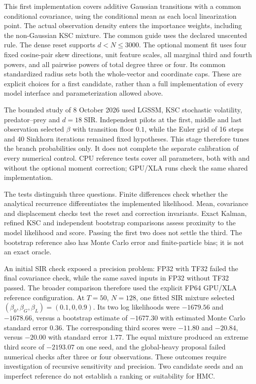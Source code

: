 This first implementation covers additive Gaussian transitions with a common
conditional covariance, using the conditional mean as each local linearization
point. The actual observation density enters the importance weights, including
the non-Gaussian KSC mixture. The common guide uses the declared unscented rule.
The dense reset supports \(d<N\leq3000\). The optional moment fit uses four
fixed cosine-pair skew directions, unit feature scales, all marginal third and
fourth powers, and all pairwise powers of total degree three or four. Its common
standardized radius sets both the whole-vector and coordinate caps.
These are explicit choices for a first candidate, rather than a full
implementation of every model interface and parameterization allowed above.

The bounded study of 8 October 2026 used LGSSM, KSC stochastic volatility,
predator--prey and \(d=18\) SIR. Independent pilots at the first, middle and
last observation selected \(\beta\) with transition floor \(0.1\), while the
Euler grid of 16 steps and 40 Sinkhorn iterations remained fixed hypotheses.
This stage therefore tunes the branch probabilities only. It does not complete
the separate calibration of every numerical control. CPU reference tests cover
all parameters, both with and without the optional moment correction; GPU/XLA
runs check the same shared implementation.

The tests distinguish three questions. Finite differences check whether the
analytical recurrence differentiates the implemented likelihood. Mean,
covariance and displacement checks test the reset and correction invariants.
Exact Kalman, refined KSC and independent bootstrap comparisons assess proximity
to the model likelihood and score. Passing the first two does not settle the
third. The bootstrap reference also has Monte Carlo error and finite-particle
bias; it is not an exact oracle.

An initial SIR check exposed a precision problem: FP32 with TF32 failed the
final covariance check, while the same saved inputs in FP32 without TF32 passed.
The broader comparison therefore used the explicit FP64 GPU/XLA reference
configuration. At \(T=50\), \(N=128\), one fitted SIR mixture selected
\((\beta_0,\beta_G,\beta_L)=(0.1,0,0.9)\). Its two log likelihoods were
\(-1679.56\) and \(-1678.66\), versus a bootstrap estimate of \(-1677.30\)
with estimated Monte Carlo standard error \(0.36\). The corresponding third
scores were \(-11.80\) and \(-20.84\), versus \(-20.00\) with standard error
\(1.77\). The equal mixture produced an extreme third score of \(-2193.07\)
on one seed, and the global-heavy proposal failed numerical checks after
three or four observations. These outcomes require investigation of recursive
sensitivity and precision. Two candidate seeds and an imperfect reference do
not establish a ranking or suitability for HMC.


